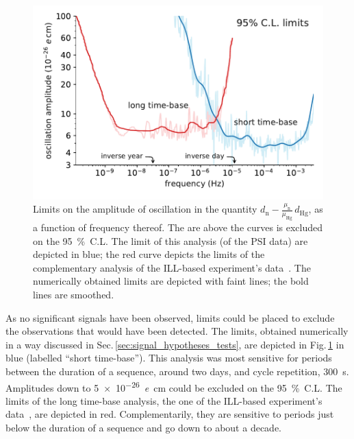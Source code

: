 \begin{figure}
  \centering
  \includegraphics[width=\linewidth]{gfx/axions/psi_ill_1e-26ecm.pdf}
  \caption{Limits on the amplitude of oscillation in the quantity $d_\text{n} - \frac{\mu_\text{n}}{\mu_\text{Hg}} \, d_\text{Hg}$, as a function of frequency thereof. The are above the curves is excluded on the \SI{95}{\percent}~C.L. The limit of this analysis (of the PSI data) are depicted in blue; the red curve depicts the limits of the complementary analysis of the ILL-based experiment's data~\cite{AyresThesis,PhysRevX.7.041034}. The numerically obtained limits are depicted with faint lines; the bold lines are smoothed.}
\label{fig:axions_limits_nEDM}
\end{figure}

As no significant signals have been observed, limits could be placed to exclude the observations that would have been detected. The limits, obtained numerically in a way discussed in Sec.\,\ref{sec:signal_hypotheses_tests}, are depicted in Fig.\,\ref{fig:axions_limits_nEDM} in blue (labelled ``short time-base''). This analysis was most sensitive for periods between the duration of a sequence, around two days, and cycle repetition, \SI{300}{\second}. Amplitudes down to \SI{5e-26}{\elementarycharge\centi\meter} could be excluded on the \SI{95}{\percent}~C.L. The limits of the long time-base analysis, the one of the ILL-based experiment's data~\cite{AyresThesis,PhysRevX.7.041034}, are depicted in red. Complementarily, they are sensitive to periods just below the duration of a sequence and go down to about a decade.

